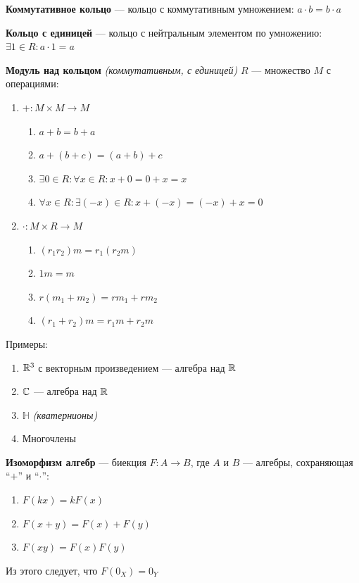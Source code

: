 \textbf{Коммутативное кольцо} --- кольцо с коммутативным умножением: $a\cdot b = b\cdot a$

\textbf{Кольцо с единицей} --- кольцо с нейтральным элементом по умножению: $\exists 1\in R : a\cdot 1 = a$

\textbf{Модуль над кольцом} \textit{(коммутативным, с единицей)} $R$ --- множество $M$ с операциями:
\begin{enumerate}
    \item $+:M\times M\to M$ \begin{enumerate}
        \item $a+b=b+a$
        \item $a+(b+c)=(a+b)+c$
        \item $\exists 0\in R : \forall x\in R : x + 0 = 0 + x = x$
        \item $\forall x\in R : \exists (-x)\in R : x + (-x) = (-x) + x = 0$
    \end{enumerate}
    \item $\cdot : M\times R\to M$ \begin{enumerate}
        \item $(r_1r_2)m=r_1(r_2m)$
        \item $1m=m$
        \item $r(m_1+m_2)=rm_1+rm_2$
        \item $(r_1+r_2)m=r_1m+r_2m$
    \end{enumerate}
\end{enumerate}

Примеры:
\begin{enumerate}
    \item $\mathbb{R}^3$ с векторным произведением --- алгебра над $\mathbb{R}$
    \item $\mathbb{C}$ --- алгебра над $\mathbb{R}$
    \item $\mathbb H$ \textit{(кватернионы)}
    \item Многочлены
\end{enumerate}

\textbf{Изоморфизм алгебр} --- биекция $F : A\to B$, где $A$ и $B$ --- алгебры, сохраняющая ``$+$'' и ``$\cdot$'':
\begin{enumerate}
    \item $F(kx)=kF(x)$
    \item $F(x + y) = F(x) + F(y)$
    \item $F(xy) = F(x)F(y)$
\end{enumerate}

Из этого следует, что $F(0_X)=0_Y$

